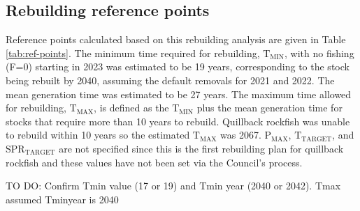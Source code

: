 \documentclass[11pt,
  english,
  a4paper,
]{article}
\begin{document}
\leavevmode\tagmcend\tagstructend


\hypertarget{rebuilding-reference-points}{%
\subsection{Rebuilding reference points}\label{rebuilding-reference-points}}

\leavevmode\tagmcend\tagstructend


Reference points calculated based on this rebuilding analysis are given in Table \ref{tab:ref-points}. The minimum time required for rebuilding, {\(\text{T}_\text{MIN}\)\leavevmode\tagmcend\tagstructend}, with no fishing (F=0) starting in 2023 was estimated to be 19 years, corresponding to the stock being rebuilt by 2040, assuming the default removals for 2021 and 2022. The mean generation time was estimated to be 27 years. The maximum time allowed for rebuilding, {\(\text{T}_\text{MAX}\)\leavevmode\tagmcend\tagstructend}, is defined as the {\(\text{T}_\text{MIN}\)\leavevmode\tagmcend\tagstructend} plus the mean generation time for stocks that require more than 10 years to rebuild. Quillback rockfish was unable to rebuild within 10 years so the estimated {\(\text{T}_\text{MAX}\)\leavevmode\tagmcend\tagstructend} was 2067. {\(\text{P}_\text{MAX}\)\leavevmode\tagmcend\tagstructend}, {\(\text{T}_\text{TARGET}\)\leavevmode\tagmcend\tagstructend}, and {\(\text{SPR}_\text{TARGET}\)\leavevmode\tagmcend\tagstructend} are not specified since this is the first rebuilding plan for quillback rockfish and these values have not been set via the Council's process.

\leavevmode\tagmcend\tagstructend\par


TO DO: Confirm Tmin value (17 or 19) and Tmin year (2040 or 2042). Tmax assumed Tminyear is 2040

\leavevmode\tagmcend\tagstructend\par
\end{document}
